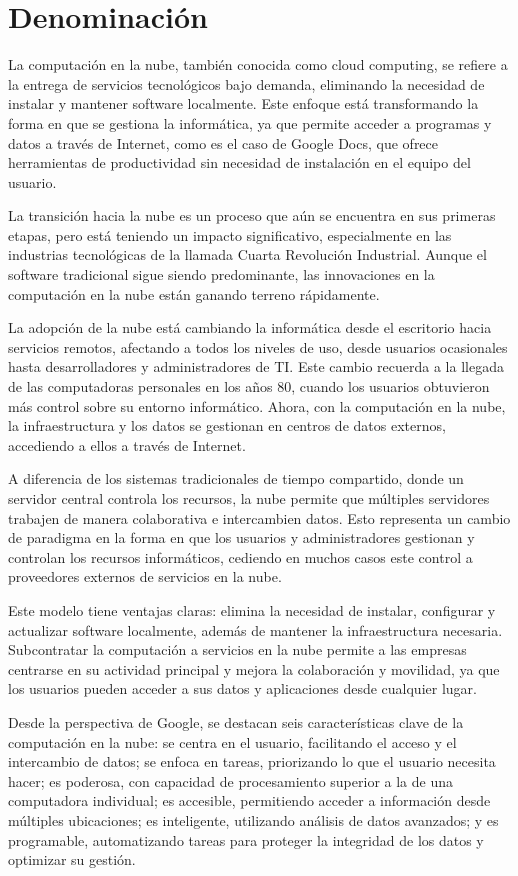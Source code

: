 \documentclass[a4paper,10pt]{article}
\begin{document}
\section{Denominación}
La computación en la nube, también conocida como cloud computing, se refiere a la entrega de servicios tecnológicos bajo demanda, eliminando la necesidad de instalar y mantener software localmente. Este enfoque está transformando la forma en que se gestiona la informática, ya que permite acceder a programas y datos a través de Internet, como es el caso de Google Docs, que ofrece herramientas de productividad sin necesidad de instalación en el equipo del usuario.

La transición hacia la nube es un proceso que aún se encuentra en sus primeras etapas, pero está teniendo un impacto significativo, especialmente en las industrias tecnológicas de la llamada Cuarta Revolución Industrial. Aunque el software tradicional sigue siendo predominante, las innovaciones en la computación en la nube están ganando terreno rápidamente.

La adopción de la nube está cambiando la informática desde el escritorio hacia servicios remotos, afectando a todos los niveles de uso, desde usuarios ocasionales hasta desarrolladores y administradores de TI. Este cambio recuerda a la llegada de las computadoras personales en los años 80, cuando los usuarios obtuvieron más control sobre su entorno informático. Ahora, con la computación en la nube, la infraestructura y los datos se gestionan en centros de datos externos, accediendo a ellos a través de Internet.

A diferencia de los sistemas tradicionales de tiempo compartido, donde un servidor central controla los recursos, la nube permite que múltiples servidores trabajen de manera colaborativa e intercambien datos. Esto representa un cambio de paradigma en la forma en que los usuarios y administradores gestionan y controlan los recursos informáticos, cediendo en muchos casos este control a proveedores externos de servicios en la nube.

Este modelo tiene ventajas claras: elimina la necesidad de instalar, configurar y actualizar software localmente, además de mantener la infraestructura necesaria. Subcontratar la computación a servicios en la nube permite a las empresas centrarse en su actividad principal y mejora la colaboración y movilidad, ya que los usuarios pueden acceder a sus datos y aplicaciones desde cualquier lugar.

Desde la perspectiva de Google, se destacan seis características clave de la computación en la nube: se centra en el usuario, facilitando el acceso y el intercambio de datos; se enfoca en tareas, priorizando lo que el usuario necesita hacer; es poderosa, con capacidad de procesamiento superior a la de una computadora individual; es accesible, permitiendo acceder a información desde múltiples ubicaciones; es inteligente, utilizando análisis de datos avanzados; y es programable, automatizando tareas para proteger la integridad de los datos y optimizar su gestión.
\end{document}
